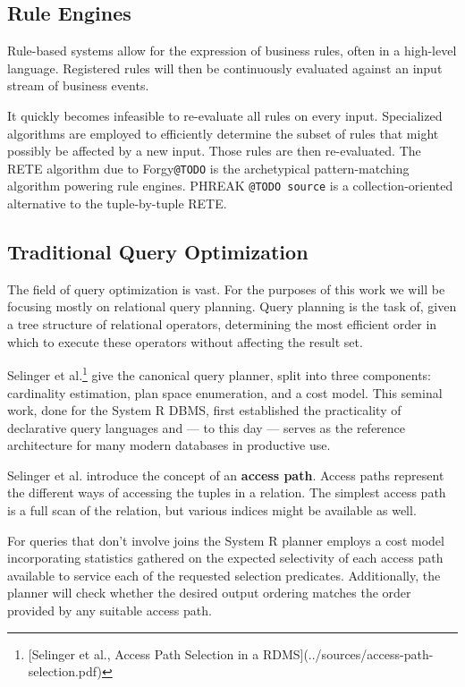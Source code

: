 \documentclass[../index.tex]{subfiles}
\begin{document}
\subsection{Rule Engines}

Rule-based systems allow for the expression of business rules, often
in a high-level language. Registered rules will then be continuously
evaluated against an input stream of business events. 

It quickly becomes infeasible to re-evaluate all rules on every
input. Specialized algorithms are employed to efficiently determine
the subset of rules that might possibly be affected by a new
input. Those rules are then re-evaluated. The RETE algorithm due to
Forgy\texttt{@TODO} is the archetypical pattern-matching algorithm powering
rule engines. PHREAK \texttt{@TODO source} is a collection-oriented
alternative to the tuple-by-tuple RETE.

\subsection{Traditional Query Optimization}

The field of query optimization is vast. For the purposes of this work
we will be focusing mostly on relational query planning. Query
planning is the task of, given a tree structure of relational
operators, determining the most efficient order in which to execute
these operators without affecting the result set.

Selinger et al.\footnote{[Selinger et al., Access Path Selection in a RDMS](../sources/access-path-selection.pdf)} give the canonical query planner, split into three
components: cardinality estimation, plan space enumeration, and a cost
model. This seminal work, done for the System R DBMS, first
established the practicality of declarative query languages and — to
this day — serves as the reference architecture for many modern
databases in productive use.

Selinger et al. introduce the concept of an \textbf{access path}. Access
paths represent the different ways of accessing the tuples in a
relation. The simplest access path is a full scan of the relation, but
various indices might be available as well.

For queries that don't involve joins the System R planner employs a
cost model incorporating statistics gathered on the expected
selectivity of each access path available to service each of the
requested selection predicates. Additionally, the planner will check
whether the desired output ordering matches the order provided by any
suitable access path.
\end{document}
